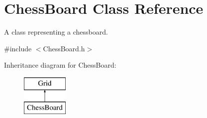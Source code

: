 \hypertarget{classChessBoard}{}\section{Chess\+Board Class Reference}
\label{classChessBoard}


A class representing a chessboard.  




{\ttfamily \#include $<$Chess\+Board.\+h$>$}

Inheritance diagram for Chess\+Board\+:\begin{figure}[H]
\begin{center}
\leavevmode
\includegraphics[height=2.000000cm]{classChessBoard}
\end{center}
\end{figure}
